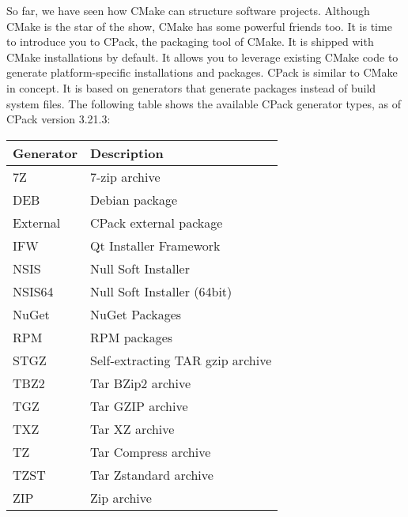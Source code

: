 So far, we have seen how CMake can structure software projects. Although CMake is the star of the show, CMake has some powerful friends too. It is time to introduce you to CPack, the packaging tool of CMake. It is shipped with CMake installations by default. It allows you to leverage existing CMake code to generate platform-specific installations and packages. CPack is similar to CMake in concept. It is based on generators that generate packages instead of build system files. The following table shows the available CPack generator types, as of CPack version 3.21.3:

\begin{table}[H]
	\centering
	\begin{tabular}{|l|l|}
		\hline
		\textbf{Generator} & \textbf{Description}             \\ \hline
		7Z                 & 7-zip archive                    \\ \hline
		DEB                & Debian package                   \\ \hline
		External           & CPack external package           \\ \hline
		IFW                & Qt Installer Framework           \\ \hline
		NSIS               & Null Soft Installer              \\ \hline
		NSIS64             & Null Soft Installer (64bit)      \\ \hline
		NuGet              & NuGet Packages                   \\ \hline
		RPM                & RPM packages                     \\ \hline
		STGZ               & Self-extracting TAR gzip archive \\ \hline
		TBZ2               & Tar BZip2 archive                \\ \hline
		TGZ                & Tar GZIP archive                 \\ \hline
		TXZ                & Tar XZ archive                   \\ \hline
		TZ                 & Tar Compress archive             \\ \hline
		TZST               & Tar Zstandard archive            \\ \hline
		ZIP                & Zip archive                      \\ \hline
	\end{tabular}
\end{table}

